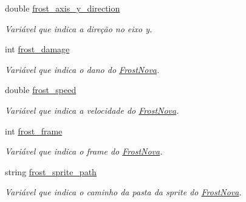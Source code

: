 \begin{DoxyCompactItemize}
double \mbox{\hyperlink{classFrostNova_a256719b17a21ec85291b5970a4209f65}{frost\+\_\+axis\+\_\+y\+\_\+direction}}
\begin{DoxyCompactList}\small\item\em Variável que indica a direção no eixo y. \end{DoxyCompactList}\item 
\mbox{\label{classFrostNova_aa804b9ee177657db6a8651c825b2ea01}} 
int \mbox{\hyperlink{classFrostNova_aa804b9ee177657db6a8651c825b2ea01}{frost\+\_\+damage}}
\begin{DoxyCompactList}\small\item\em Variável que indica o dano do \mbox{\hyperlink{classFrostNova}{Frost\+Nova}}. \end{DoxyCompactList}\item 
\mbox{\label{classFrostNova_a6d73e795f2a7379f9db5f04ca96c5b30}} 
double \mbox{\hyperlink{classFrostNova_a6d73e795f2a7379f9db5f04ca96c5b30}{frost\+\_\+speed}}
\begin{DoxyCompactList}\small\item\em Variável que indica a velocidade do \mbox{\hyperlink{classFrostNova}{Frost\+Nova}}. \end{DoxyCompactList}\item 
\mbox{\label{classFrostNova_ac86bc4b1a3fa29a5d756ec8272168bca}} 
int \mbox{\hyperlink{classFrostNova_ac86bc4b1a3fa29a5d756ec8272168bca}{frost\+\_\+frame}}
\begin{DoxyCompactList}\small\item\em Variável que indica o frame do \mbox{\hyperlink{classFrostNova}{Frost\+Nova}}. \end{DoxyCompactList}\item 
\mbox{\label{classFrostNova_a06f3570a18cfbd5dc174892c6afe5b87}} 
string \mbox{\hyperlink{classFrostNova_a06f3570a18cfbd5dc174892c6afe5b87}{frost\+\_\+sprite\+\_\+path}}
\begin{DoxyCompactList}\small\item\em Variável que indica o caminho da pasta da sprite do \mbox{\hyperlink{classFrostNova}{Frost\+Nova}}. \end{DoxyCompactList}\item 
\mbox{\label{classFrostNova_a6d4b037d224fbb3a24e440f0a65ea91f}} 

\end{DoxyCompactItemize}
